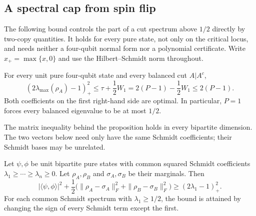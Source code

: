 \subsection{A spectral cap from spin flip}
\label{sec:fqe-spectral-spinflip}

The following bound controls the part of a cut spectrum above $1/2$
directly by two-copy quantities. It holds for every pure state, not only on
the critical locus, and needs neither a four-qubit normal form nor a
polynomial certificate.
Write $x_+=\max\{x,0\}$ and use the Hilbert--Schmidt norm throughout.

\begin{proposition}
\label{prop:fqe-spectral-spinflip}
For every unit pure four-qubit state and every balanced cut $A|A^c$,
\begin{equation}\label{eq:fqe-spectral-spinflip}
 \boxed{\quad
 (2\lambda_{\max}(\rho_A)-1)_+^2
 \le \tau+\frac12W_1
 =2(P-1)-\frac12W_1\le2(P-1).
 \quad}
\end{equation}
Both coefficients on the first right-hand side are optimal. In particular,
$P=1$ forces every balanced eigenvalue to be at most $1/2$.
\end{proposition}

The matrix inequality behind the proposition holds in every bipartite
dimension. The two vectors below need only have the same Schmidt
coefficients; their Schmidt bases may be unrelated.

\begin{lemma}
\label{lem:fqe-isospectral-overlap}
Let $\psi,\phi$ be unit bipartite pure states with common squared Schmidt
coefficients $\lambda_1\ge\cdots\ge\lambda_n\ge0$. Let
$\rho_A,\rho_B$ and $\sigma_A,\sigma_B$ be their marginals. Then
\begin{equation}\label{eq:fqe-isospectral-overlap}
 |\langle\psi,\phi\rangle|^2+
 \frac12\bigl(\|\rho_A-\sigma_A\|_F^2+
                    \|\rho_B-\sigma_B\|_F^2\bigr)
 \ge (2\lambda_1-1)_+^2.
\end{equation}
For each common Schmidt spectrum with $\lambda_1\ge1/2$, the bound is
attained by changing the sign of every Schmidt term except the first.
\end{lemma}

